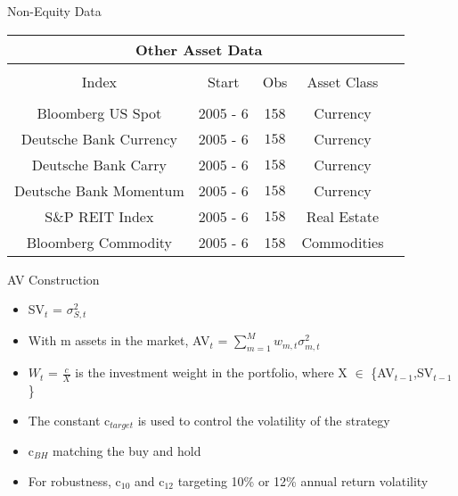 \documentclass{beamer}
\begin{document}
\begin{frame}{Non-Equity Data}
	\begin{adjustbox}{width=\textwidth}
		\begin{tabular}{ccccc}
			\multicolumn{4}{c}{Other Asset Data}\\
			\hline \hline \\[-1.8ex] 
			Index & Start & Obs & Asset Class\\
			\hline\\
			Bloomberg US Spot & 2005 - 6 & 158 & Currency\\
			Deutsche Bank Currency & 2005 - 6 & $158$& Currency \\ 
			Deutsche Bank Carry & 2005 - 6 & $158$& Currency \\ 
			Deutsche Bank Momentum & 2005 - 6 & $158$& Currency \\ 
			S\&P REIT Index & 2005 - 6 & $158$& Real Estate \\
			Bloomberg Commodity & 2005 - 6 &158 & Commodities\\
			\hline
		\end{tabular}
	\end{adjustbox}
\end{frame}
\begin{frame}{AV Construction}
		\begin{itemize}
			\item SV$_{t}$ = $\sigma^{2}_{S,t}$
			\item With m assets in the market, AV$_{t}$ = $\sum_{m=1}^{M} w_{m,t}\sigma^{2}_{m,t}$
			\item $W_{t}$ = $\frac{c}{X}$ is the investment weight in the portfolio, where X $\in$ \{AV$_{t-1}$,SV$_{t-1}$\}
			\item The constant c$_{target}$ is used to control the volatility of the strategy
			\item c$_{BH}$ matching the buy and hold
			\item For robustness, c$_{10}$ and c$_{12}$ targeting 10\% or 12\% annual return volatility
		\end{itemize}
\end{frame}

\end{document}
